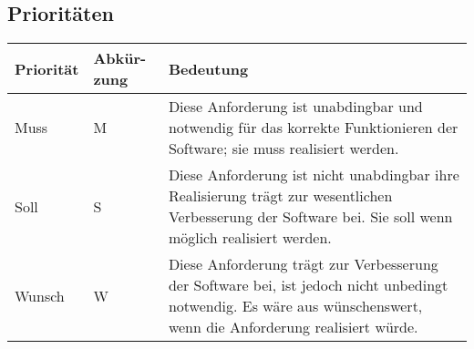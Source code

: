 \subsection{Prioritäten}

\begin{tabular}{| p{3cm} | p{2cm} | p{10cm} |}

\hline
\textbf{Priorität} & 
\textbf{Abkür-} \newline \textbf{zung} & 
\textbf{Bedeutung} \\
\hline

Muss & 
M & 
Diese Anforderung ist unabdingbar und notwendig für das korrekte Funktionieren der Software; sie muss realisiert werden. \\
\hline

Soll &
S &
Diese Anforderung ist nicht unabdingbar ihre Realisierung trägt zur wesentlichen Verbesserung der Software bei. Sie soll wenn möglich realisiert werden. \\
\hline

Wunsch &
W &
Diese Anforderung trägt zur Verbesserung der Software bei, ist jedoch nicht unbedingt notwendig. Es wäre aus wünschenswert, wenn die Anforderung realisiert würde. \\
\hline

\end{tabular}

